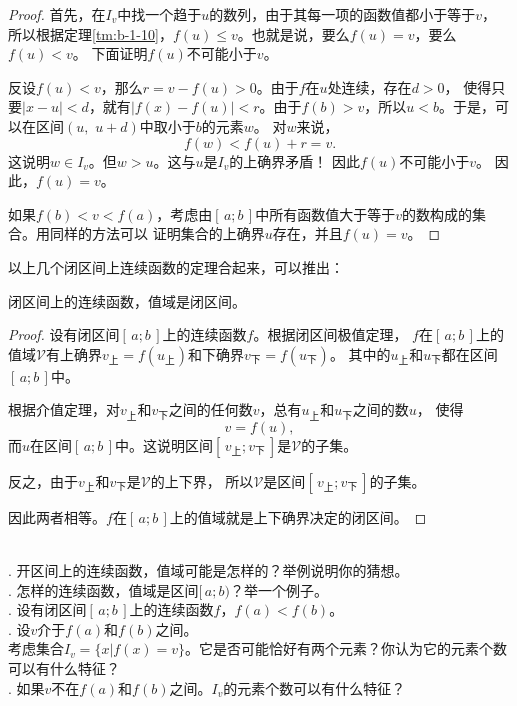 \documentclass[12pt,UTF8,fontset=none]{ctexbook}
\begin{document}
\begin{appendix}
\begin{proof}
    首先，在$I_v$中找一个趋于$u$的数列，由于其每一项的函数值都小于等于$v$，
    所以根据定理\ref{tm:b-1-10}，$f(u)\leqslant v$。也就是说，要么$f(u) = v$，要么$f(u) < v$。
    下面证明$f(u)$不可能小于$v$。

    反设$f(u)< v$，那么$r = v - f(u) > 0$。由于$f$在$u$处连续，存在$d>0$，
    使得只要$|x - u| < d$，就有$|f(x) - f(u)| < r$。由于$f(b) > v$，所以$u < b$。于是，可以在区间$(u, \,\, u+d)$中取小于$b$的元素$w$。
    对$w$来说，
    $$ f(w) < f(u) + r = v.$$
    这说明$w\in I_v$。但$w>u$。这与$u$是$I_v$的上确界矛盾！
    因此$f(u)$不可能小于$v$。
    因此，$f(u) = v$。

    如果$f(b) < v < f(a)$，考虑由$[\,a;b\,]$中所有函数值大于等于$v$的数构成的集合。用同样的方法可以
    证明集合的上确界$u$存在，并且$f(u) = v$。

\end{proof}

以上几个闭区间上连续函数的定理合起来，可以推出：
\begin{tm}
    闭区间上的连续函数，值域是闭区间。
\end{tm}
\begin{proof}
    设有闭区间$[\,a;b\,]$上的连续函数$f$。根据闭区间极值定理，
    $f$在$[\,a;b\,]$上的值域$\mathcal{V}$有上确界$v_{\text{上}} = f(u_{\text{上}})$和下确界$v_{\text{下}} = f(u_{\text{下}})$。
    其中的$u_{\text{上}}$和$u_{\text{下}}$都在区间$[\,a;b\,]$中。

    根据介值定理，对$v_{\text{上}}$和$v_{\text{下}}$之间的任何数$v$，总有$u_{\text{上}}$和$u_{\text{下}}$之间的数$u$，
    使得
    $$ v = f(u),$$
    而$u$在区间$[\,a;b\,]$中。这说明区间$[\,v_{\text{上}};v_{\text{下}}\,]$是$\mathcal{V}$的子集。

    反之，由于$v_{\text{上}}$和$v_{\text{下}}$是$\mathcal{V}$的上下界，
    所以$\mathcal{V}$是区间$[\,v_{\text{上}};v_{\text{下}}\,]$的子集。

    因此两者相等。$f$在$[\,a;b\,]$上的值域就是上下确界决定的闭区间。

\end{proof}

\begin{sk}
    \mbox{} \\
    . 开区间上的连续函数，值域可能是怎样的？举例说明你的猜想。\\
    . 怎样的连续函数，值域是区间$[\,a; b)$？举一个例子。\\
    . 设有闭区间$[\,a;b\,]$上的连续函数$f$，$f(a) < f(b)$。\\
    . 设$v$介于$f(a)$和$f(b)$之间。\\
    考虑集合$I_v = \{x | f(x) = v\}$。它是否可能恰好有两个元素？你认为它的元素个数可以有什么特征？\\
    . 如果$v$不在$f(a)$和$f(b)$之间。$I_v$的元素个数可以有什么特征？
\end{sk}


\end{appendix}
\end{document}
